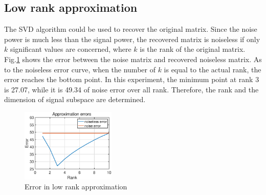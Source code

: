 \subsection{Low rank approximation}
The SVD algorithm could be used to recover the original matrix. Since the noise power is much less than the signal power, the recovered matrix is noiseless if only $k$ significant values are concerned, where $k$ is the rank of the original matrix. Fig.\ref{fig:1_6_b} shows the error between the noise matrix and recovered noiseless matrix. As to the noiseless error curve, when the number of $k$ is equal to the actual rank, the error reaches the bottom point. In this experiment, the minimum point at rank 3 is 27.07, while it is 49.34 of noise error over all rank. Therefore, the rank and the dimension of signal subspace are determined.
\begin{figure}[htbp]
    \centering
    \includegraphics[width=0.4\textwidth]{fig/16/16b.eps}
    \caption{Error in low rank approximation}
    \label{fig:1_6_b}
\end{figure}
